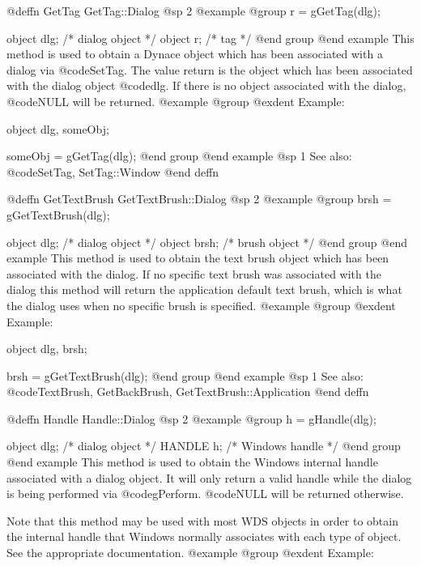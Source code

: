 @deffn {GetTag} GetTag::Dialog
@sp 2
@example
@group
r = gGetTag(dlg);

object  dlg;   /*  dialog object  */
object  r;     /*  tag            */
@end group
@end example
This method is used to obtain a Dynace object which has been associated
with a dialog via @code{SetTag}.  The value return is the object which has
been associated with the dialog object @code{dlg}.  If there is no object
associated with the dialog, @code{NULL} will be returned.
@example
@group
@exdent Example:

object  dlg, someObj;

someObj = gGetTag(dlg);
@end group
@end example
@sp 1
See also:  @code{SetTag, SetTag::Window}
@end deffn










@deffn {GetTextBrush} GetTextBrush::Dialog
@sp 2
@example
@group
brsh = gGetTextBrush(dlg);

object  dlg;    /*  dialog object  */
object  brsh;   /*  brush object   */
@end group
@end example
This method is used to obtain the text brush object which has been associated
with the dialog.  If no specific text brush was associated with the dialog
this method will return the application default text brush, which is what
the dialog uses when no specific brush is specified.
@example
@group
@exdent Example:

object  dlg, brsh;

brsh = gGetTextBrush(dlg);
@end group
@end example
@sp 1
See also:  @code{TextBrush, GetBackBrush, GetTextBrush::Application}
@end deffn











@deffn {Handle} Handle::Dialog
@sp 2
@example
@group
h = gHandle(dlg);

object  dlg;    /*  dialog object   */
HANDLE  h;      /*  Windows handle  */
@end group
@end example
This method is used to obtain the Windows internal handle associated with
a dialog object.  It will only return a valid handle while the dialog
is being performed via @code{gPerform}.  @code{NULL} will be returned
otherwise.

Note that this method may be used with most WDS objects in order to obtain
the internal handle that Windows normally associates with each type of object.
See the appropriate documentation.
@example
@group
@exdent Example:

